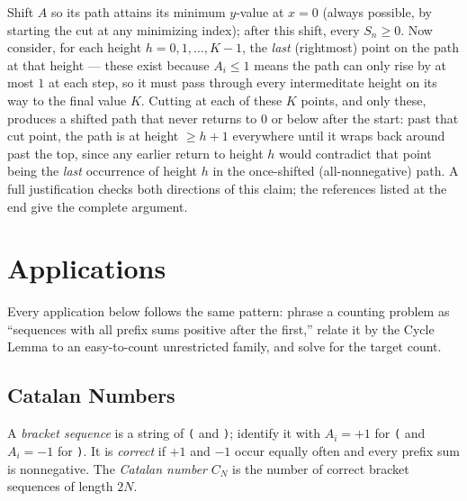 \documentclass[11pt]{article}
\begin{document}
Shift $A$ so its path attains its minimum $y$-value at $x=0$ (always
possible, by starting the cut at any minimizing index); after this shift,
every $S_n \ge 0$. Now consider, for each height $h = 0, 1, \ldots, K-1$,
the \emph{last} (rightmost) point on the path at that height --- these
exist because $A_i \le 1$ means the path can only rise by at most $1$ at
each step, so it must pass through every intermeditate height on its way
to the final value $K$. Cutting at each of these $K$ points, and only
these, produces a shifted path that never returns to $0$ or below after
the start: past that cut point, the path is at height $\ge h+1$ everywhere
until it wraps back around past the top, since any earlier return to
height $h$ would contradict that point being the \emph{last} occurrence
of height $h$ in the once-shifted (all-nonnegative) path. A full
justification checks both directions of this claim; the references listed
at the end give the complete argument.

\section{Applications}
Every application below follows the same pattern: phrase a counting
problem as ``sequences with all prefix sums positive after the first,''
relate it by the Cycle Lemma to an easy-to-count unrestricted family, and
solve for the target count.

\subsection{Catalan Numbers}
\begin{definitionbox}
A \emph{bracket sequence} is a string of \texttt{(} and \texttt{)};
identify it with $A_i = +1$ for \texttt{(} and $A_i=-1$ for \texttt{)}. It
is \emph{correct} if $+1$ and $-1$ occur equally often and every prefix
sum is nonnegative. The \emph{Catalan number} $C_N$ is the number of
correct bracket sequences of length $2N$.
\end{definitionbox}
\end{document}

